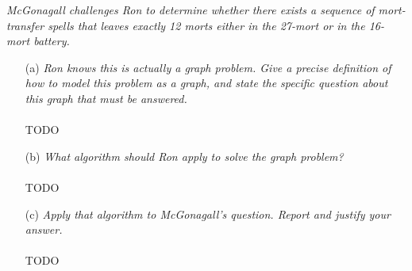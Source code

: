 \documentclass[12pt]{article} \setlength{\oddsidemargin}{0in}
\begin{document}
\textit{McGonagall challenges Ron to determine whether there exists a
  sequence of mort-transfer spells that leaves exactly 12 morts either
  in the 27-mort or in the 16-mort battery.}

\begin{enumerate}
\item[(a)]{\textit{Ron knows this is actually a graph problem. Give a
      precise definition of how to model this problem as a graph, and
      state the specific question about this graph that must be
      answered.}}
  \\\\
  TODO
  \\
\item[(b)]{\textit{What algorithm should Ron apply to solve the graph
      problem?}}
  \\\\
  TODO
  \\
\item[(c)]{\textit{Apply that algorithm to McGonagall’s
      question. Report and justify your answer.}}
  \\\\
  TODO

\end{enumerate}
  
\end{document}
